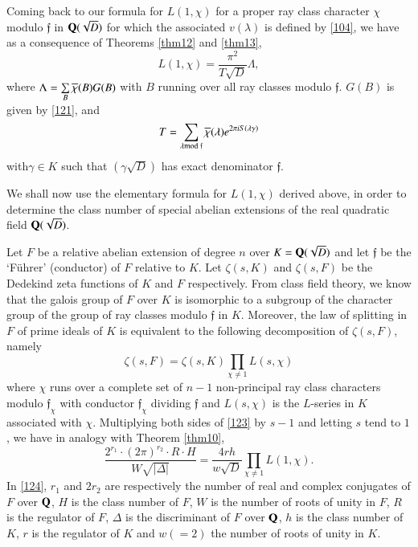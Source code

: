 Coming back to our formula for $L(1,\chi)$ for a proper ray class
character $\chi$ modulo $\mathfrak{f}$ in $\mathbf{Q}(\sqrt{D})$ for which
the associated $v(\lambda)$ is defined by \eqref{104}, we have as a
consequence of Theorems \ref{thm12} and \ref{thm13},
\begin{equation*}
L(1,\chi)=\frac{\pi^{2}}{T\sqrt{D}}\Lambda,\tag{122}\label{122}
\end{equation*}
where $\Lambda=\sum\limits_{B}\overline{\chi}(B)G(B)$ with $B$ running over
all ray classes modulo $\mathfrak{f}$. $G(B)$ is given by \eqref{121},
and
$$
T=\sum_{\lambda\rm{mod} \; \mathfrak{f}}\overline{\chi}(\lambda)e^{2\pi
  iS(\lambda\gamma)}
$$
with\pageoriginale $\gamma\in K$ such that $(\gamma\sqrt{D})$ has
exact denominator $\mathfrak{f}$.

We shall now use the elementary formula for $L(1,\chi)$ derived above,
in order to determine the class number of special abelian extensions
of the real quadratic field $\mathbf{Q}(\sqrt{D})$.

Let $F$ be a relative abelian extension of degree $n$ over
$K=\mathbf{Q}(\sqrt{D})$ and let $\mathfrak{f}$ be the `F\"uhrer' (conductor)
of $F$ relative to $K$. Let $\zeta(s,K)$ and $\zeta(s,F)$ be the
Dedekind zeta functions of $K$ and $F$ respectively. From class field
theory, we know that the galois group of $F$ over $K$ is isomorphic to
a subgroup of the character group of the group of ray classes modulo
$\mathfrak{f}$ in $K$. Moreover, the law of splitting in $F$ of prime
ideals of $K$ is equivalent to the following decomposition of
$\zeta(s,F)$, namely
\begin{equation*}
\zeta(s,F)=\zeta(s,K)\prod_{\chi\neq 1}L(s,\chi)\tag{123}\label{123}
\end{equation*}
where $\chi$ runs over a complete set of $n-1$ non-principal ray class
characters modulo $\mathfrak{f}_{\chi}$ with conductor
$\mathfrak{f}_{\chi}$ dividing $\mathfrak{f}$ and $L(s,\chi)$ is the
$L$-series in $K$ associated with $\chi$. Multiplying both sides of
\eqref{123} by $s-1$ and letting $s$ tend to $1$, we have in analogy
with Theorem \ref{thm10},
\begin{equation*}
\frac{2^{r_{1}}\cdot (2\pi)^{r_{2}}\cdot R\cdot
  H}{W\sqrt{|\Delta|}}=\frac{4rh}{w\sqrt{D}}\prod_{\chi\neq
  1}L(1,\chi).\tag{124}\label{124} 
\end{equation*}
In \eqref{124}, $r_{1}$ and $2r_{2}$ are respectively the number of
real and complex conjugates of $F$ over $\mathbf{Q}$, $H$ is the class number
of $F$, $W$ is the number of roots of unity in $F$, $R$ is the
regulator of $F$, $\Delta$ is the discriminant of $F$ over $\mathbf{Q}$, $h$
is the class number of $K$, $r$ is the regulator of $K$ and $w(=2)$
the number of roots of unity in $K$.

